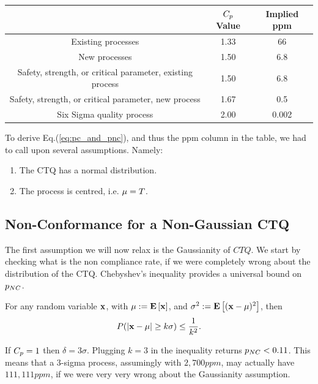 \begin{tabular}{|c|c|c|}
\hline  & $C_p$ Value & Implied ppm \\ 
\hline \hline Existing processes
 & 1.33
 & 66 \\ 
\hline New processes
 & 1.50
 & 6.8 \\ 
\hline Safety, strength, or critical
parameter, existing process
 & 1.50
 & 6.8 \\ 
\hline Safety, strength, or critical
parameter, new process
 & 1.67
 & 0.5 \\ 
\hline Six Sigma quality process & 2.00 &  0.002 \\ 
\hline 
\end{tabular} 

\bigskip

To derive Eq.(\ref{eq:pc_and_pnc}), and thus the ppm column in the table, we had to call upon several assumptions.
Namely:
\begin{enumerate}
\item The CTQ has a normal distribution.
\item The process is centred, i.e. $\mu=T$.
\end{enumerate}








\subsection{Non-Conformance for a Non-Gaussian CTQ}
The first assumption we will now relax is the Gaussianity of $CTQ$. 
We start by checking what is the non compliance rate, if we were completely wrong about the distribution of the CTQ. 
Chebyshev's inequality provides a universal bound on $p_{NC}$.


\begin{theorem}
For any random variable $\mathbf{x}$, with $\mu:=\mathbf{E}\left[ \mathbf{x} \right]$, and $\sigma^2:=\mathbf{E}\left[ (\mathbf{x}-\mu)^2 \right]$, then
\begin{align}
	P(|\mathbf{x}-\mu| \geq k\sigma) \leq \frac{1}{k^2}.
\end{align}
\end{theorem}
If $C_p=1$  then $\delta=3\sigma$. Plugging $k=3$ in the inequality returns $p_{NC}<0.11$.
This means that a 3-sigma process, assumingly with $2,700 ppm$, may actually have $111,111 ppm$, if we were very very wrong about the Gaussianity assumption.



